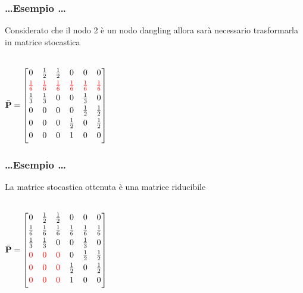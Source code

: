 \documentclass{beamer}
\begin{document}
\begin{frame}
	\frametitle{\dots Esempio \dots}
	Considerato che il nodo 2 è un nodo dangling allora sarà necessario trasformarla in matrice stocastica
	\\~
	\begin{center}
	$\bar{\textbf{P}} = \begin{bmatrix}
	0           & \frac{1}{2} & \frac{1}{2} & 0          & 0          & 0           \\[0.3em]
	\textcolor{red}{\frac{1}{6}} & \textcolor{red}{\frac{1}{6}} & \textcolor{red}{\frac{1}{6}} & \textcolor{red}{\frac{1}{6}}& \textcolor{red}{\frac{1}{6}}& \textcolor{red}{\frac{1}{6}} \\[0.3em]
	\frac{1}{3} & \frac{1}{3} & 0           & 0          & \frac{1}{3}& 0           \\[0.3em]
	0           & 0           & 0           & 0          & \frac{1}{2}& \frac{1}{2} \\[0.3em]
	0           & 0           & 0           & \frac{1}{2}& 0          & \frac{1}{2} \\[0.3em]
	0           & 0           & 0           & 1          & 0          & 0           \\[0.3em]
	\end{bmatrix}$
	\end{center}
\end{frame}
\begin{frame}
	\frametitle{\dots Esempio \dots}
	La matrice stocastica ottenuta è una matrice riducibile
	\\~\\
	\begin{center}
	$\bar{\textbf{P}} = \begin{bmatrix}
	0           & \frac{1}{2} & \frac{1}{2} & 0          & 0          & 0           \\[0.3em]
	\frac{1}{6} & \frac{1}{6} & \frac{1}{6} & \frac{1}{6}& \frac{1}{6}& \frac{1}{6} \\[0.3em]
	\frac{1}{3} & \frac{1}{3} & 0           & 0          & \frac{1}{3}& 0           \\[0.3em]
	\textcolor{red}{0}& \textcolor{red}{0} &\textcolor{red}{0}& 0          & \frac{1}{2}& \frac{1}{2} \\[0.3em]
	\textcolor{red}{0}& \textcolor{red}{0} &\textcolor{red}{0}& \frac{1}{2}& 0          & \frac{1}{2} \\[0.3em]
	\textcolor{red}{0}& \textcolor{red}{0} &\textcolor{red}{0}& 1          & 0          & 0           \\[0.3em]
	\end{bmatrix}$
	\end{center}
\end{frame}
\end{document}
